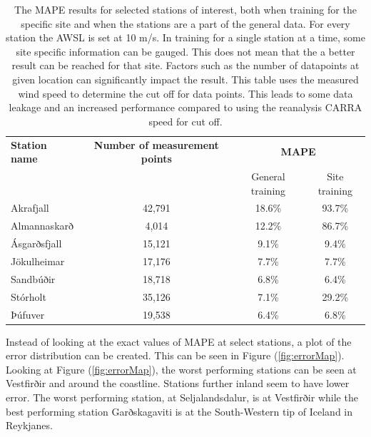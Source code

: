 \begin{table}[h]
    \caption[Model result by station]{The MAPE results for selected stations of interest, both when training for the specific site and when the stations are a part of the general data. For every station the AWSL is set at 10 m/s. In training for a single station at a time, some site specific information can be gauged. This does not mean that the a better result can be reached for that site. Factors such as the number of datapoints at given location can significantly impact the result. This table uses the measured wind speed to determine the cut off for data points. This leads to some data leakage and an increased performance compared to using the reanalysis CARRA speed for cut off.}
    \label{table:specific_sites}
    \centering
    \begin{tabular}{lccc}
        \textbf{Station name} & \textbf{Number of measurement points} & \multicolumn{2}{c}{\textbf{MAPE}}\\
        & & General training & Site training\\\hline
        Akrafjall & 42,791 & 18.6\% & 93.7\%\\
        Almannaskarð & 4,014 & 12.2\% & 86.7\%\\
        Ásgarðsfjall & 15,121 & 9.1\% & 9.4\%\\
        Jökulheimar & 17,176 & 7.7\% & 7.7\%\\
        Sandbúðir & 18,718 & 6.8\% & 6.4\%\\
        Stórholt & 35,126 & 7.1\% & 29.2\% \\
        Þúfuver & 19,538 & 6.4\% & 6.8\%\\
    \end{tabular}
\end{table}

Instead of looking at the exact values of MAPE at select stations, a plot of the error distribution can be created. This can be seen in Figure (\ref{fig:errorMap}). Looking at Figure (\ref{fig:errorMap}), the worst performing stations can be seen at Vestfirðir and around the coastline. Stations further inland seem to have lower error. The worst performing station, at Seljalandsdalur, is at Vestfirðir while the best performing station Garðskagaviti is at the South-Western tip of Iceland in Reykjanes.

